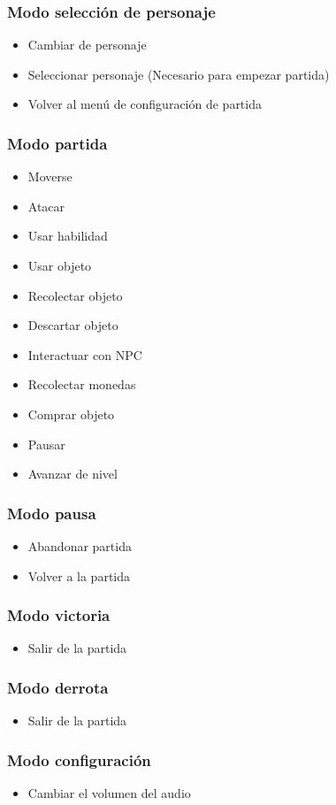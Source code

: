 \subsubsection{Modo selección de personaje}
\begin{itemize}
    \item Cambiar de personaje
    \item Seleccionar personaje (Necesario para empezar partida)
    \item Volver al menú de configuración de partida
\end{itemize}

\subsubsection{Modo partida}

\begin{itemize}
    \item Moverse
    \item Atacar
    \item Usar habilidad
    \item Usar objeto
    \item Recolectar objeto
    \item Descartar objeto
    \item Interactuar con NPC
    \item Recolectar monedas
    \item Comprar objeto
    \item Pausar
    \item Avanzar de nivel
\end{itemize}

\subsubsection{Modo pausa}
\begin{itemize}
    \item Abandonar partida
    \item Volver a la partida
\end{itemize}

\subsubsection{Modo victoria}
\begin{itemize}
    \item Salir de la partida
\end{itemize}

\subsubsection{Modo derrota}
\begin{itemize}
    \item Salir de la partida
\end{itemize}

\subsubsection{Modo configuración}
\begin{itemize}
    \item Cambiar el volumen del audio
\end{itemize}